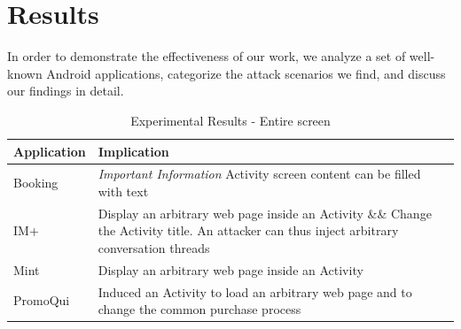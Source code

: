 \section{Results}
\label{sec:results}

In order to demonstrate the effectiveness of our work, we analyze a set of well-known Android applications, categorize
the attack scenarios we find, and discuss our findings in detail.

\begin{table}[t]
\centering
\renewcommand{\arraystretch}{1.3}

\parbox{.45\linewidth}{
  \centering
  \caption{Experimental Results - Entire screen}
  \label{table:1}
  \begin{tabular}{|l|p{5cm}|}%
    \hline
    Application & Implication \\ \hline
    Booking & \emph{Important Information} Activity screen content can be filled with text\\
    IM+ & Display an arbitrary web page inside an Activity \&\& Change the Activity title. An attacker can thus inject arbitrary conversation threads \\
    Mint & Display an arbitrary web page inside an Activity \\
    PromoQui & Induced an Activity to load an arbitrary web page and to change the common purchase process \\

\end{tabular}}
\end{table}
